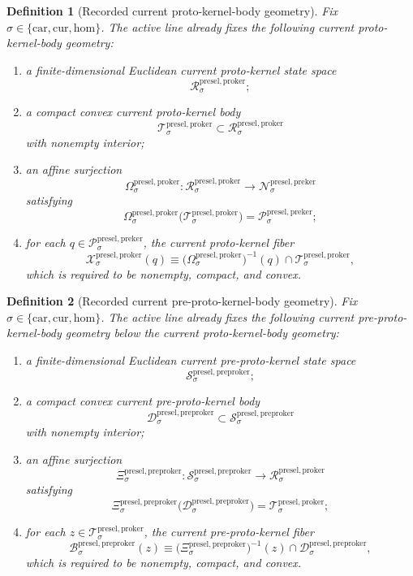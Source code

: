 \documentclass[11pt]{article}
\newcommand{\Car}{\mathrm{car}}
\newcommand{\Cur}{\mathrm{cur}}
\newcommand{\Hom}{\mathrm{hom}}
\newcommand{\PreKernelSpace}[1]{\mathcal N_{#1}^{\mathrm{presel,preker}}}
\newcommand{\PreKernelBody}[1]{\mathcal P_{#1}^{\mathrm{presel,preker}}}
\newcommand{\ProtoKernelSpace}[1]{\mathcal R_{#1}^{\mathrm{presel,proker}}}
\newcommand{\ProtoKernelBody}[1]{\mathcal T_{#1}^{\mathrm{presel,proker}}}
\newcommand{\ProtoKernelProj}[1]{\Omega_{#1}^{\mathrm{presel,proker}}}
\newcommand{\ProtoKernelFiber}[2]{\mathcal X_{#1}^{\mathrm{presel,proker}}(#2)}
\newcommand{\PreProtoKernelSpace}[1]{\mathcal S_{#1}^{\mathrm{presel,preproker}}}
\newcommand{\PreProtoKernelBody}[1]{\mathcal D_{#1}^{\mathrm{presel,preproker}}}
\newcommand{\PreProtoKernelProj}[1]{\Xi_{#1}^{\mathrm{presel,preproker}}}
\newcommand{\PreProtoKernelFiber}[2]{\mathcal B_{#1}^{\mathrm{presel,preproker}}(#2)}
\newtheorem{definition}{Definition}
\begin{document}
\begin{definition}[Recorded current proto-kernel-body geometry]
\label{def:protokernelgeometry}
Fix \(\sigma\in\{\Car,\Cur,\Hom\}\). The active line already fixes the following current proto-kernel-body geometry:
\begin{enumerate}
    \item a finite-dimensional Euclidean current proto-kernel state space
    \[
    \ProtoKernelSpace{\sigma};
    \]
    \item a compact convex current proto-kernel body
    \[
    \ProtoKernelBody{\sigma}\subset\ProtoKernelSpace{\sigma}
    \]
    with nonempty interior;
    \item an affine surjection
    \[
    \ProtoKernelProj{\sigma}:\ProtoKernelSpace{\sigma}\to\PreKernelSpace{\sigma}
    \]
    satisfying
    \[
    \ProtoKernelProj{\sigma}\bigl(\ProtoKernelBody{\sigma}\bigr)=\PreKernelBody{\sigma};
    \]
    \item for each \(q\in\PreKernelBody{\sigma}\), the current proto-kernel fiber
    \[
    \ProtoKernelFiber{\sigma}{q}
    \equiv
    \bigl(\ProtoKernelProj{\sigma}\bigr)^{-1}(q)\cap\ProtoKernelBody{\sigma},
    \]
    which is required to be nonempty, compact, and convex.
\end{enumerate}
\end{definition}

\begin{definition}[Recorded current pre-proto-kernel-body geometry]
\label{def:preprotogeometry}
Fix \(\sigma\in\{\Car,\Cur,\Hom\}\). The active line already fixes the following current pre-proto-kernel-body geometry below the current proto-kernel-body geometry:
\begin{enumerate}
    \item a finite-dimensional Euclidean current pre-proto-kernel state space
    \[
    \PreProtoKernelSpace{\sigma};
    \]
    \item a compact convex current pre-proto-kernel body
    \[
    \PreProtoKernelBody{\sigma}\subset\PreProtoKernelSpace{\sigma}
    \]
    with nonempty interior;
    \item an affine surjection
    \[
    \PreProtoKernelProj{\sigma}:\PreProtoKernelSpace{\sigma}\to\ProtoKernelSpace{\sigma}
    \]
    satisfying
    \[
    \PreProtoKernelProj{\sigma}\bigl(\PreProtoKernelBody{\sigma}\bigr)=\ProtoKernelBody{\sigma};
    \]
    \item for each \(z\in\ProtoKernelBody{\sigma}\), the current pre-proto-kernel fiber
    \[
    \PreProtoKernelFiber{\sigma}{z}
    \equiv
    \bigl(\PreProtoKernelProj{\sigma}\bigr)^{-1}(z)\cap\PreProtoKernelBody{\sigma},
    \]
    which is required to be nonempty, compact, and convex.
\end{enumerate}
\end{definition}
\end{document}

